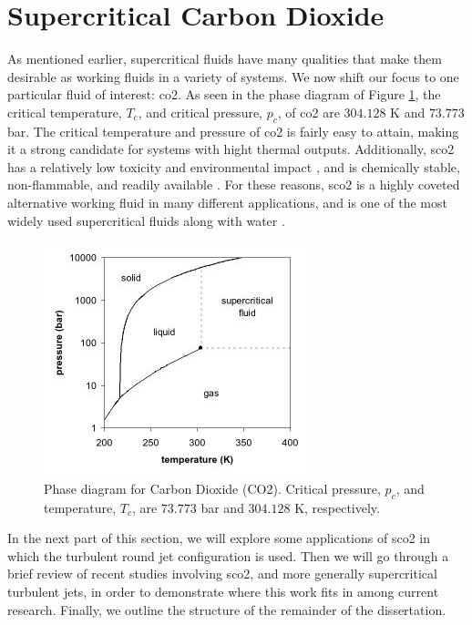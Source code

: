 
\section{Supercritical Carbon Dioxide}
As mentioned earlier, supercritical fluids have many qualities that make them desirable as working fluids in a variety of systems. We now shift our focus to one particular fluid of interest: \gls{co2}. As seen in the phase diagram of Figure \ref{phase_diagram}, the critical temperature, $T_c$, and critical pressure, $p_c$, of \gls{co2} are $304.128 $ K and $73.773$ bar. The critical temperature and pressure of \gls{co2} is fairly easy to attain, making it a strong candidate for systems with hight thermal outputs. Additionally, \gls{sco2} has a relatively low toxicity and environmental impact \cite{}, and is chemically stable, non-flammable, and readily available \cite{}. For these reasons, \gls{sco2} is a highly coveted alternative working fluid in many different applications, and is one of the most widely used supercritical fluids along with water \cite{SCF2}. 

\begin{figure}[h!]
\begin{center}
\includegraphics[scale=.75]{figures/co2_phase_diagram}
\end{center}
\caption{Phase diagram for Carbon Dioxide (CO2). Critical pressure, $p_c$, and temperature, $T_c$, are $73.773$ bar and $304.128$ K, respectively.}
\label{phase_diagram}
\end{figure}

In the next part of this section, we will explore some applications of \gls{sco2} in which the turbulent round jet configuration is used. Then we will go through a brief review of recent studies involving \gls{sco2}, and more generally supercritical turbulent jets, in order to demonstrate where this work fits in among current research. Finally, we outline the structure of the remainder of the dissertation. 

